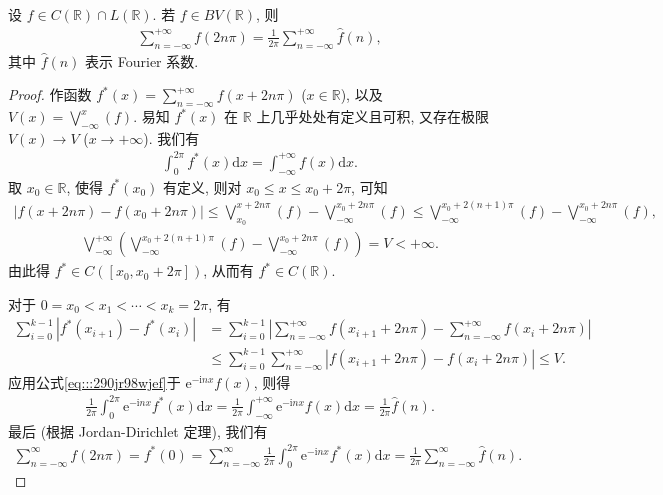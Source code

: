 \documentclass[../../main.tex]{subfiles}%
\begin{document}
\begin{proposition}[Poisson公式]
设 $f\in C(\mathbb{R})\cap L(\mathbb{R})$. 若 $f\in BV(\mathbb{R})$, 则
\begin{align*}
\sum_{n=-\infty}^{+\infty} f(2n\pi) = \frac{1}{2\pi}\sum_{n=-\infty}^{+\infty} \hat{f}(n),
\end{align*}
其中 $\hat{f}(n)$ 表示 Fourier 系数.
\end{proposition}
\begin{proof}
作函数 $f^*(x)=\sum_{n=-\infty}^{+\infty} f(x+2n\pi)$ ($x\in\mathbb{R}$), 以及 $V(x)=\bigvee_{-\infty}^x(f)$. 易知 $f^*(x)$ 在 $\mathbb{R}$ 上几乎处处有定义且可积, 又存在极限 $V(x)\to V$ ($x\to+\infty$). 我们有
\begin{align}\label{eq:::290jr98wjef}
\int_0^{2\pi} f^*(x)\mathrm{d}x = \int_{-\infty}^{+\infty} f(x)\mathrm{d}x.
\end{align}
取 $x_0\in\mathbb{R}$, 使得 $f^*(x_0)$ 有定义, 则对 $x_0\leqslant x\leqslant x_0+2\pi$, 可知
\begin{align*}
|f(x+2n\pi)-f(x_0+2n\pi)| \leqslant \bigvee_{x_0}^{x+2n\pi}(f) - \bigvee_{-\infty}^{x_0+2n\pi}(f) 
\leqslant \bigvee_{-\infty}^{x_0+2(n+1)\pi}(f) - \bigvee_{-\infty}^{x_0+2n\pi}(f), 
\end{align*}
\begin{align*}
\bigvee_{-\infty}^{+\infty}\left(\bigvee_{-\infty}^{x_0+2(n+1)\pi}(f) - \bigvee_{-\infty}^{x_0+2n\pi}(f)\right) = V < +\infty.
\end{align*}
由此得 $f^*\in C([x_0,x_0+2\pi])$, 从而有 $f^*\in C(\mathbb{R})$.

对于 $0=x_0<x_1<\cdots<x_k=2\pi$, 有
\begin{align*}
\sum_{i=0}^{k-1} |f^*(x_{i+1})-f^*(x_i)|
&= \sum_{i=0}^{k-1} \left|\sum_{n=-\infty}^{+\infty} f(x_{i+1}+2n\pi) - \sum_{n=-\infty}^{+\infty} f(x_i+2n\pi)\right| \\
&\leqslant \sum_{i=0}^{k-1} \sum_{n=-\infty}^{+\infty} |f(x_{i+1}+2n\pi)-f(x_i+2n\pi)| \leqslant V.
\end{align*}
应用公式\eqref{eq:::290jr98wjef}于 $\mathrm{e}^{-\mathrm{i}nx}f(x)$, 则得
\begin{align*}
\frac{1}{2\pi}\int_0^{2\pi} \mathrm{e}^{-\mathrm{i}nx}f^*(x)\mathrm{d}x = \frac{1}{2\pi}\int_{-\infty}^{+\infty} \mathrm{e}^{-\mathrm{i}nx}f(x)\mathrm{d}x = \frac{1}{2\pi}\hat{f}(n).
\end{align*}
最后 (根据 Jordan-Dirichlet 定理), 我们有
\begin{align*}
\sum_{n=-\infty}^{\infty} f(2n\pi) = f^*(0) = \sum_{n=-\infty}^{\infty} \frac{1}{2\pi}\int_0^{2\pi} \mathrm{e}^{-\mathrm{i}nx}f^*(x)\mathrm{d}x = \frac{1}{2\pi}\sum_{n=-\infty}^{\infty} \hat{f}(n).
\end{align*}
\end{proof}
\end{document}
